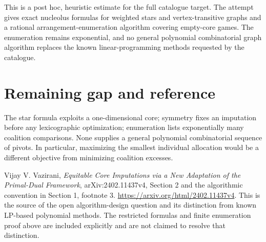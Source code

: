 \documentclass[11pt,a4paper]{article}
\theoremstyle{definition}
\theoremstyle{remark}
\begin{document}
This is a post hoc, heuristic estimate for the full catalogue target.
The attempt gives exact nucleolus formulas for weighted stars and vertex-transitive graphs and a rational arrangement-enumeration algorithm covering empty-core games. The enumeration remains exponential, and no general polynomial combinatorial graph algorithm replaces the known linear-programming methods requested by the catalogue.

\section{Remaining gap and reference}
The star formula exploits a one-dimensional core; symmetry fixes an imputation before any lexicographic optimization; enumeration lists exponentially many coalition comparisons. None supplies a general polynomial combinatorial sequence of pivots. In particular, maximizing the smallest individual allocation would be a different objective from minimizing coalition excesses.

Vijay V. Vazirani, \emph{Equitable Core Imputations via a New Adaptation of the Primal-Dual Framework}, arXiv:2402.11437v4, Section 2 and the algorithmic convention in Section 1, footnote 3. \url{https://arxiv.org/html/2402.11437v4}. This is the source of the open algorithm-design question and its distinction from known LP-based polynomial methods. The restricted formulas and finite enumeration proof above are included explicitly and are not claimed to resolve that distinction.
\end{document}
